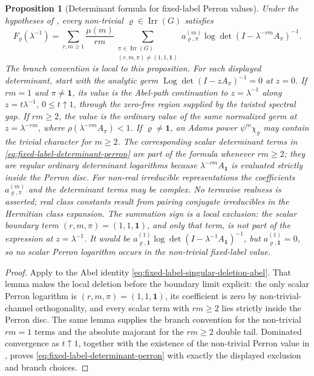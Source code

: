 \documentclass[11pt,a4paper]{amsart}
\theoremstyle{plain}
\newtheorem{proposition}[theorem]{Proposition}
\theoremstyle{definition}
\theoremstyle{remark}
\DeclareMathOperator{\Irr}{Irr}
\DeclareMathOperator{\Log}{Log}
\begin{document}
\begin{proposition}[Determinant formula for fixed-label Perron values]
  \label{prop:fixed-label-determinant-perron}
  Under the hypotheses of , every
  non-trivial \(\varrho\in\Irr(G)\) satisfies
  \begin{equation}\label{eq:fixed-label-determinant-perron}
    F_\varrho(\lambda^{-1})
    =
    \sum_{r,m\ge1}\frac{\mu(m)}{rm}
      \sum_{\substack{\pi\in\Irr(G)\\(r,m,\pi)\neq(1,1,\mathbf1)}}
        a_{\varrho,\pi}^{(m)}
        \log\det(I-\lambda^{-rm}A_\pi)^{-1}.
  \end{equation}
  The branch convention is local to this proposition. For each displayed
  determinant, start with the analytic germ
  \(\Log\det(I-zA_\pi)^{-1}=0\) at \(z=0\).  If \(rm=1\) and
  \(\pi\neq\mathbf1\), its value is the Abel-path continuation to
  \(z=\lambda^{-1}\) along \(z=t\lambda^{-1}\),
  \(0\le t\uparrow1\), through the zero-free region supplied by the
  twisted spectral gap.  If \(rm\ge2\), the value is the ordinary value of
  the same normalized germ at \(z=\lambda^{-rm}\), where
  \(\rho(\lambda^{-rm}A_\pi)<1\).
  If \(\varrho\neq\mathbf1\), an Adams power \(\psi^m\chi_\varrho\) may
  contain the trivial character for \(m\ge2\).  The corresponding scalar
  determinant terms in \eqref{eq:fixed-label-determinant-perron} are part
  of the formula whenever \(rm\ge2\); they are regular ordinary
  determinant logarithms because \(\lambda^{-rm}A_{\mathbf1}\) is evaluated
  strictly inside the Perron disc.
  For non-real irreducible representations the coefficients
  \(a_{\varrho,\pi}^{(m)}\) and the determinant terms may be complex.  No
  termwise realness is asserted; real class constants result from pairing
  conjugate irreducibles in the Hermitian class expansion.
  The summation sign is a local exclusion: the scalar boundary term
  \((r,m,\pi)=(1,1,\mathbf1)\), and only that term, is not part of the
  expression at \(z=\lambda^{-1}\). It would be
  \(a_{\varrho,\mathbf1}^{(1)}
  \log\det(I-\lambda^{-1}A_{\mathbf1})^{-1}\), but
  \(a_{\varrho,\mathbf1}^{(1)}=0\), so no scalar Perron logarithm occurs
  in the non-trivial fixed-label value.
\end{proposition}

\begin{proof}
  Apply  to the Abel identity
  \eqref{eq:fixed-label-singular-deletion-abel}.  That lemma makes the local
  deletion before the boundary limit explicit: the only scalar Perron
  logarithm is \((r,m,\pi)=(1,1,\mathbf1)\), its coefficient is zero by
  non-trivial-channel orthogonality, and every scalar term with \(rm\ge2\)
  lies strictly inside the Perron disc.  The same lemma supplies the branch
  convention for the non-trivial \(rm=1\) terms and the absolute majorant for
  the \(rm\ge2\) double tail.  Dominated convergence as \(t\uparrow1\),
  together with the existence of the non-trivial Perron value in
  , proves
  \eqref{eq:fixed-label-determinant-perron} with exactly the displayed
  exclusion and branch choices.
\end{proof}
\end{document}
